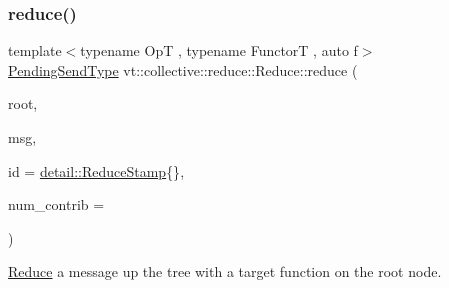 \mbox{\label{structvt_1_1collective_1_1reduce_1_1_reduce_a7389031519cb9fd1b8dde2c3b19db7e0}} 
\subsubsection{\texorpdfstring{reduce()}{reduce()}\hspace{0.1cm}{\footnotesize\ttfamily [10/10]}}
{\footnotesize\ttfamily template$<$typename OpT , typename FunctorT , auto f$>$ \\
\hyperlink{structvt_1_1collective_1_1reduce_1_1_reduce_a0474b491f3c93014d9a0ce0356c6bfd5}{Pending\+Send\+Type} vt\+::collective\+::reduce\+::\+Reduce\+::reduce (\begin{DoxyParamCaption}\item[{\hyperlink{namespacevt_a866da9d0efc19c0a1ce79e9e492f47e2}{Node\+Type} const \&}]{root,  }\item[{typename \hyperlink{structvt_1_1_func_traits}{Func\+Traits}$<$ decltype(f)$>$\+::MsgT $\ast$}]{msg,  }\item[{\hyperlink{namespacevt_1_1collective_1_1reduce_1_1detail_aacc1fcd729d934ba143fee3a943bf9e7}{detail\+::\+Reduce\+Stamp}}]{id = {\ttfamily \hyperlink{namespacevt_1_1collective_1_1reduce_1_1detail_aacc1fcd729d934ba143fee3a943bf9e7}{detail\+::\+Reduce\+Stamp}\{\}},  }\item[{\hyperlink{structvt_1_1collective_1_1reduce_1_1_reduce_a6c3e63aca10c31d2823b0b18cf9762a4}{Reduce\+Num\+Type} const \&}]{num\+\_\+contrib = {} }\end{DoxyParamCaption})\hspace{0.3cm}{\ttfamily [inline]}}



\hyperlink{structvt_1_1collective_1_1reduce_1_1_reduce}{Reduce} a message up the tree with a target function on the root node. 


